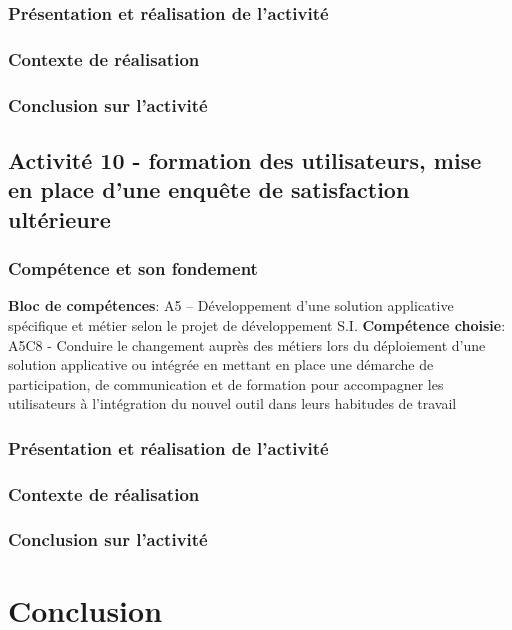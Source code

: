 \documentclass[a4paper, 11pt]{report}
\begin{document}
\subsection{Présentation et réalisation de l'activité}
\subsection{Contexte de réalisation}
\subsection{Conclusion sur l'activité}

\section{Activité 10 - formation des utilisateurs, mise en place d’une enquête de satisfaction ultérieure}
\subsection{Compétence et son fondement}
\textbf{Bloc de compétences}: A5 – Développement d’une solution applicative spécifique et métier selon le projet de développement S.I.
\newline
\textbf{Compétence choisie}: A5C8 - Conduire le changement auprès des métiers lors du déploiement d’une solution applicative ou intégrée en mettant en place une démarche de participation, de communication et de formation pour accompagner les utilisateurs à l’intégration du nouvel outil dans leurs habitudes de travail
\subsection{Présentation et réalisation de l'activité}
\subsection{Contexte de réalisation}
\subsection{Conclusion sur l'activité}

\chapter{Conclusion}
\end{document}
